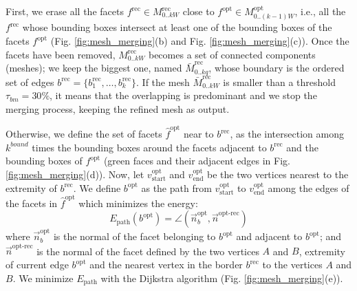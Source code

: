First, we erase all the facets  $f^{\text{rec}} \in \mathit{M}_{0..kW}^{\text{rec}}$ close to $f^{\text{opt}} \in \mathit{M}_{0..(k-1)W}^{\text{opt}}$, i.e., all the $f^{\text{rec}}$ whose bounding boxes intersect at least one of the bounding boxes of the facets $f^{\text{opt}}$ (Fig. \ref{fig:mesh_merging}(b) and Fig. \ref{fig:mesh_merging}(c)).
Once the facets have been removed, $\mathit{M}_{0..kW}^{\text{rec}}$ becomes a set of connected components (meshes); we keep the biggest one, named $\mathit{\bar{M}}_{0..kq}^{\text{rec}}$, whose boundary is the ordered set of edges $\mathit{b}^{\text{rec}} = \{b_1^{\text{rec}}, \dots,  b_k^{\text{rec}}\}$.
If the mesh $\mathit{\bar{M}}_{0..kW}^{\text{rec}}$ is smaller than a threshold $\tau_{bm}=30\%$, it means that the overlapping is predominant and we stop the merging process, keeping the refined mesh as output.

Otherwise, we define the set of facets $\hat{f}^{\text{opt}}$ near to $\mathit{b}^{\text{rec}}$, as the intersection among  $k^{bound}$ times the bounding boxes around the facets adjacent to  $\mathit{b}^{\text{rec}}$ and the bounding boxes of $f^{\text{opt}}$  (green faces and their adjacent edges in Fig. \ref{fig:mesh_merging}(d)).
Now, let  $v_{\text{start}}^{\text{opt}}$ and $v_{\text{end}}^{\text{opt}}$ be the two vertices nearest to the extremity of  $\mathit{b}^{\text{rec}}$. 
We define $\mathit{b}^{\text{opt}}$ as the path from $v_{\text{start}}^{\text{opt}}$ to $v_{\text{end}}^{\text{opt}}$ among the edges of the facets in $\hat{f}^{\text{opt}}$ which minimizes the energy:
\begin{equation}
  E_{\text{path}}(b^{\text{opt}}) = \angle (\overrightarrow{n}_b^{\text{opt}},\overrightarrow{n}^{\text{opt-rec}})
\end{equation}
where $\overrightarrow{n}_b^{\text{opt}}$ is the normal of the facet belonging to $\mathit{b}^{\text{opt}}$ and adjacent to  $b^{\text{opt}}$; and
$\overrightarrow{n}^{\text{opt-rec}}$ is the normal of the facet defined by the two vertices $A$ and $B$, extremity of current edge ${b}^{\text{opt}}$ and the nearest vertex in the border $\mathit{b}^{\text{rec}}$ to the vertices $A$ and $B$.
We minimize $E_{\text{path}}$ with the Dijkstra algorithm  (Fig. \ref{fig:mesh_merging}(e)).

